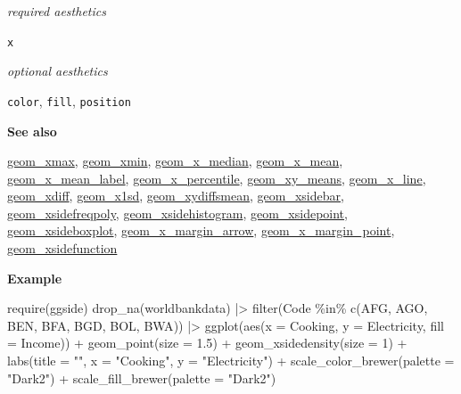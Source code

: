 \documentclass[
  letterpaper,
  DIV=11,
  numbers=noendperiod]{scrreprt}
\newenvironment{Shaded}{\begin{snugshade}}{\end{snugshade}}
\newcommand{\AttributeTok}[1]{\textcolor[rgb]{0.40,0.45,0.13}{#1}}
\newcommand{\DecValTok}[1]{\textcolor[rgb]{0.68,0.00,0.00}{#1}}
\newcommand{\FloatTok}[1]{\textcolor[rgb]{0.68,0.00,0.00}{#1}}
\newcommand{\FunctionTok}[1]{\textcolor[rgb]{0.28,0.35,0.67}{#1}}
\newcommand{\NormalTok}[1]{\textcolor[rgb]{0.00,0.23,0.31}{#1}}
\newcommand{\SpecialCharTok}[1]{\textcolor[rgb]{0.37,0.37,0.37}{#1}}
\newcommand{\StringTok}[1]{\textcolor[rgb]{0.13,0.47,0.30}{#1}}
\begin{document}
\emph{required aesthetics}

\texttt{x}

\emph{optional aesthetics}

\texttt{color}, \texttt{fill}, \texttt{position}

\textbf{See also}

\href{@xmax}{geom\_xmax}, \href{@xmin}{geom\_xmin},
\href{@x_median}{geom\_x\_median}, \href{@x_mean}{geom\_x\_mean},
\href{@x_mean_label}{geom\_x\_mean\_label},
\href{@x_percentile}{geom\_x\_percentile},
\href{@xy_means}{geom\_xy\_means}, \href{@x_line}{geom\_x\_line},
\href{@xdiff}{geom\_xdiff}, \href{@x1sd}{geom\_x1sd},
\href{@xydiffsmean}{geom\_xydiffsmean},
\href{@xsidebar}{geom\_xsidebar},
\href{@xsidefreqpoly}{geom\_xsidefreqpoly},
\href{@xsidehistogram}{geom\_xsidehistogram},
\href{@xsidepoint}{geom\_xsidepoint},
\href{@xsideboxplot}{geom\_xsideboxplot},
\href{@x_margin_arrow}{geom\_x\_margin\_arrow},
\href{@x_margin_point}{geom\_x\_margin\_point},
\href{@xsidefunction}{geom\_xsidefunction}

\textbf{Example}

\begin{Shaded}
\begin{Highlighting}[]
\FunctionTok{require}\NormalTok{(ggside)}
\FunctionTok{drop\_na}\NormalTok{(worldbankdata) }\SpecialCharTok{|\textgreater{}}
  \FunctionTok{filter}\NormalTok{(Code }\SpecialCharTok{\%in\%} \FunctionTok{c}\NormalTok{(}\StringTok{\textquotesingle{}AFG\textquotesingle{}}\NormalTok{, }\StringTok{\textquotesingle{}AGO\textquotesingle{}}\NormalTok{, }\StringTok{\textquotesingle{}BEN\textquotesingle{}}\NormalTok{, }\StringTok{\textquotesingle{}BFA\textquotesingle{}}\NormalTok{, }\StringTok{\textquotesingle{}BGD\textquotesingle{}}\NormalTok{, }\StringTok{\textquotesingle{}BOL\textquotesingle{}}\NormalTok{, }\StringTok{\textquotesingle{}BWA\textquotesingle{}}\NormalTok{)) }\SpecialCharTok{|\textgreater{}}
  \FunctionTok{ggplot}\NormalTok{(}\FunctionTok{aes}\NormalTok{(}\AttributeTok{x =}\NormalTok{ Cooking, }\AttributeTok{y =}\NormalTok{ Electricity, }\AttributeTok{fill =}\NormalTok{ Income)) }\SpecialCharTok{+}
  \FunctionTok{geom\_point}\NormalTok{(}\AttributeTok{size =} \FloatTok{1.5}\NormalTok{) }\SpecialCharTok{+}
  \FunctionTok{geom\_xsidedensity}\NormalTok{(}\AttributeTok{size =} \DecValTok{1}\NormalTok{) }\SpecialCharTok{+}
  \FunctionTok{labs}\NormalTok{(}\AttributeTok{title =} \StringTok{""}\NormalTok{, }\AttributeTok{x =} \StringTok{"Cooking"}\NormalTok{, }\AttributeTok{y =} \StringTok{"Electricity"}\NormalTok{)  }\SpecialCharTok{+} \FunctionTok{scale\_color\_brewer}\NormalTok{(}\AttributeTok{palette =} \StringTok{"Dark2"}\NormalTok{) }\SpecialCharTok{+} \FunctionTok{scale\_fill\_brewer}\NormalTok{(}\AttributeTok{palette =} \StringTok{"Dark2"}\NormalTok{)}
\end{Highlighting}
\end{Shaded}
\end{document}
